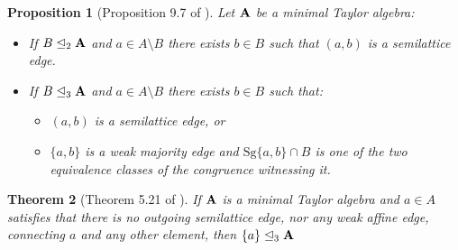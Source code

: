 \documentclass[11pt]{amsart}
\newcommand{\m}[1]{\mathbf{\uppercase{#1}}}
\newtheorem{thm}{Theorem}
\newtheorem{prp}[thm]{Proposition}
\theoremstyle{definition}
\theoremstyle{remark}
\theoremstyle{plain}
\begin{document}
\begin{prp}[Proposition 9.7 of \cite{dreamteam}]\label{smedge}
Let $\m A$ be a minimal Taylor algebra:
\begin{itemize}
\item[$\mathrm{(1)}$] If $B\trianglelefteq_2 {\m A}$ and $a\in A\setminus B$ there exists $b\in B$ such that $(a,b)$ is a semilattice edge.
\item[$\mathrm{(2)}$] If $B\trianglelefteq_3 {\m A}$ and $a\in A\setminus B$ there exists $b\in B$ such that:
\begin{itemize}
\item[$\mathrm{a)}$] $(a,b)$ is a semilattice edge, or
\item[$\mathrm{b)}$] $\{a,b\}$ is a weak majority edge and $\mathrm{Sg}\{a,b\}\cap B$ is one of the two equivalence classes of the congruence witnessing it.
\end{itemize}
\end{itemize}
\end{prp}

\begin{thm}[Theorem 5.21 of \cite{dreamteam}]\label{singletoncenter}
If $\m a$ is a minimal Taylor algebra and $a\in A$ satisfies that there is no outgoing semilattice edge, nor any weak affine edge, connecting $a$ and any other element, then $\{a\}\trianglelefteq_3 {\m A}$
\end{thm}
\end{document}
